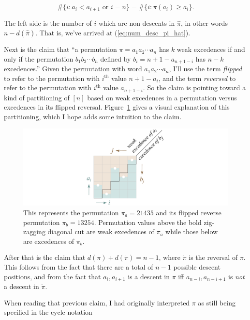 \documentclass[]{article}
\begin{document}
\[\#\{i:a_i<a_{i+1}\text{ or }i=n\} = \#\{i:\pi(a_i)\ge a_i\}.\]

The left side is the number of \(i\) which are non-descents in
\(\hat\pi\), in other words \(n - d(\hat\pi)\). That is, we've arrived
at (\ref{eq:num_desc_pi_hat}).

Next is the claim that ``a permutation \(\pi=a_1a_2\cdots a_n\) has
\(k\) weak excedences if and only if the permutation
\(b_1b_2\cdots b_n\) defined by \(b_i = n+1-a_{n+1-i}\) has \(n-k\)
excedences.'' Given the permutation with word \(a_1a_2\cdots a_n\), I'll
use the term \emph{flipped} to refer to the permutation with
\(i^\text{th}\) value \(n+1-a_i\), and the term \emph{reversed} to refer
to the permutation with \(i^\text{th}\) value \(a_{n+1-i}\). So the
claim is pointing toward a kind of partitioning of \([n]\) based on weak
excedences in a permutation versus excedences in its flipped reversal.
Figure~\ref{fig:excedence} gives a visual explanation of this
partitioning, which I hope adds some intuition to the claim.

\begin{figure}[htbp]
\centering
\includegraphics{images/pdfs/excedence.pdf}
\caption{\label{fig:excedence}This represents the permutation
\(\pi_a = 21435\) and its flipped reverse permutation \(\pi_b = 13254\).
Permutation values above the bold zig-zagging diagonal cut are weak
excedences of \(\pi_a\) while those below are excedences of
\(\pi_b\).}\label{fig:excedence}
\end{figure}

After that is the claim that \(d(\pi) + d(\dot\pi) = n - 1\), where
\(\dot\pi\) is the reversal of \(\pi\). This follows from the fact that
there are a total of \(n - 1\) possible descent positions, and from the
fact that \(a_i, a_{i+1}\) is a descent in \(\pi\) iff
\(a_{n-i}, a_{n-i+1}\) is \emph{not} a descent in \(\dot\pi\).

When reading that previous claim, I had originally interpreted \(\pi\)
as still being specified in the cycle notation
\end{document}
